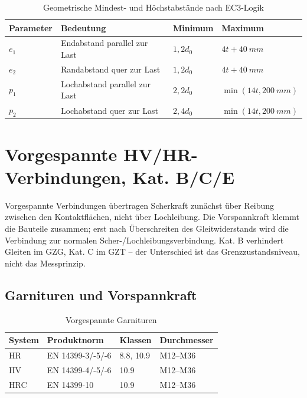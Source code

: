 \documentclass[10pt,a4paper]{article}
\begin{document}
\begin{table}[H]
\centering
\caption{Geometrische Mindest- und Höchstabstände nach EC3-Logik}
\begin{tabular}{@{}llll@{}}
\toprule
\textbf{Parameter} & \textbf{Bedeutung} & \textbf{Minimum} & \textbf{Maximum} \\
\midrule
$e_1$ & Endabstand parallel zur Last & $1{,}2d_0$ & $4t+\SI{40}{mm}$ \\
$e_2$ & Randabstand quer zur Last & $1{,}2d_0$ & $4t+\SI{40}{mm}$ \\
$p_1$ & Lochabstand parallel zur Last & $2{,}2d_0$ & $\min(14t,\SI{200}{mm})$ \\
$p_2$ & Lochabstand quer zur Last & $2{,}4d_0$ & $\min(14t,\SI{200}{mm})$ \\
\bottomrule
\end{tabular}
\end{table}

\section{Vorgespannte HV/HR-Verbindungen, Kat. B/C/E}

Vorgespannte Verbindungen übertragen Scherkraft zunächst über Reibung zwischen den Kontaktflächen, nicht über Lochleibung. Die Vorspannkraft klemmt die Bauteile zusammen; erst nach Überschreiten des Gleitwiderstands wird die Verbindung zur normalen Scher-/Lochleibungsverbindung. Kat. B verhindert Gleiten im GZG, Kat. C im GZT -- der Unterschied ist das Grenzzustandsniveau, nicht das Messprinzip.

\subsection{Garnituren und Vorspannkraft}
\begin{table}[H]
\centering
\caption{Vorgespannte Garnituren}
\begin{tabularx}{\textwidth}{@{}p{26mm}p{36mm}p{28mm}Y@{}}
\toprule
\textbf{System} & \textbf{Produktnorm} & \textbf{Klassen} & \textbf{Durchmesser} \\
\midrule
HR & EN 14399-3/-5/-6 & 8.8, 10.9 & M12--M36 \\
HV & EN 14399-4/-5/-6 & 10.9 & M12--M36 \\
HRC & EN 14399-10 & 10.9 & M12--M36 \\
\bottomrule
\end{tabularx}
\end{table}
\end{document}
